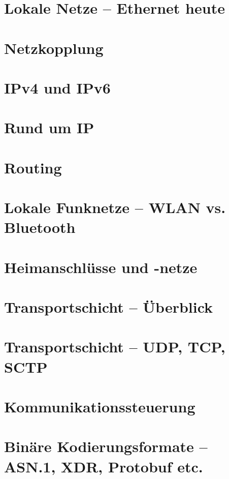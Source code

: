 \documentclass[hidelinks]{article}
\begin{document}
\section{Lokale Netze -- Ethernet heute}

\section{Netzkopplung}

\section{IPv4 und IPv6}

\section{Rund um IP}

\section{Routing}

\section{Lokale Funknetze -- WLAN vs. Bluetooth}

\section{Heimanschlüsse und -netze}

\section{Transportschicht -- Überblick}

\section{Transportschicht -- UDP, TCP, SCTP}

\section{Kommunikationssteuerung}

\section{Binäre Kodierungsformate -- ASN.1, XDR, Protobuf etc.}
\end{document}
